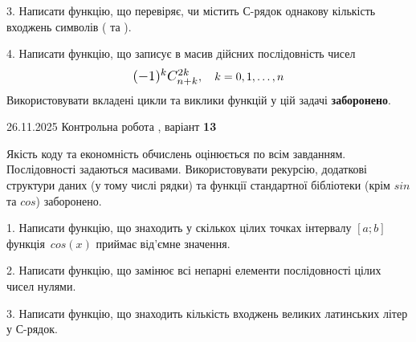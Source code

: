 \documentclass[11pt, ukrainian]{article}
\begin{document}
{{{{{{{{{{{{\begin {large}
\vspace{2mm}


3. Написати функцію, що перевіряє, чи містить С-рядок однакову кількість входжень символів ( та ).

\vspace{2mm}


4. 
Написати функцію, що записує в масив дійсних послідовність чисел
$$\scalebox{1.2}{$(-1)^{k}C_{n+k}^{2k}$}, \quad k=0,1,\ldots,n$$
\quad Використовувати вкладені цикли та виклики функцій у цій задачі \textbf{заборонено}.

\vspace{2mm}

\end{large}
\newpage
{{26.11.2025 Контрольна робота , варіант  \No \textbf { 13 }\par}}


{
Якість коду та економність обчислень оцінюється по всім завданням. Послідовності задаються масивами. Використовувати рекурсію, додаткові структури даних (у тому числі рядки) та функції стандартної бібліотеки (крім $sin$ та $cos$) заборонено.

\vspace{2mm}

\begin {large}
1. Написати функцію, що знаходить у скількох цілих точках інтервалу $[a; b]$ функція~$cos(x)$ приймає від'ємне значення.

\vspace{2mm}


2. Написати функцію, що замінює всі непарні елементи послідовності цілих чисел нулями.

\vspace{2mm}


3. Написати функцію, що знаходить кількість входжень великих латинських літер у С-рядок.

\vspace{2mm}


\end{large}}}}}}}}}}}}}}
\end{document}
